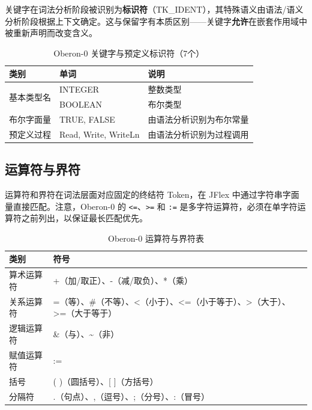 关键字在词法分析阶段被识别为\textbf{标识符}（TK\_IDENT），其特殊语义由语法/语义分析阶段根据上下文确定。这与保留字有本质区别——关键字\textbf{允许}在嵌套作用域中被重新声明而改变含义。

\begin{table}[htbp]
    \centering
    \begin{tabular}{|l|l|l|}
    \hline
    \textbf{类别} & \textbf{单词} & \textbf{说明} \\
    \hline
    \multirow{2}{*}{基本类型名} & INTEGER & 整数类型 \\
    & BOOLEAN & 布尔类型 \\
    \hline
    布尔字面量 & TRUE, FALSE & 由语法分析识别为布尔常量 \\
    \hline
    预定义过程 & Read, Write, WriteLn & 由语法分析识别为过程调用 \\
    \hline
    \end{tabular}
    \caption{Oberon-0 关键字与预定义标识符（7个）}
    \label{tab:keywords}
\end{table}

\subsection{运算符与界符}

运算符和界符在词法层面对应固定的终结符 Token，在 JFlex 中通过字符串字面量直接匹配。注意，Oberon-0 的 \texttt{<=}、\texttt{>=} 和 \texttt{:=} 是多字符运算符，必须在单字符运算符之前列出，以保证最长匹配优先。

\begin{table}[htbp]
    \centering
    \begin{tabular}{|l|l|}
    \hline
    \textbf{类别} & \textbf{符号} \\
    \hline
    算术运算符 & +（加/取正）、-（减/取负）、*（乘）\\
    关系运算符 & =（等）、\#（不等）、<（小于）、<=（小于等于）、>（大于）、>=（大于等于）\\
    逻辑运算符 & \&（与）、\~{}（非）\\
    赋值运算符 & := \\
    括号 & ( )（圆括号）、[ ]（方括号）\\
    分隔符 & .（句点）、,（逗号）、;（分号）、:（冒号）\\
    \hline
    \end{tabular}
    \caption{Oberon-0 运算符与界符表}
    \label{tab:operators}
\end{table}

